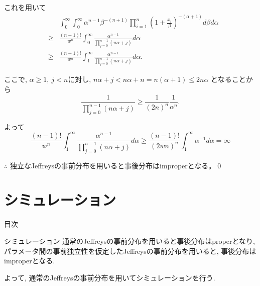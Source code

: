 \documentclass[12pt,dvipdfmx]{beamer}
\begin{document}
\begin{frame}

これを用いて
\begin{eqnarray*}
&&
\int_0^\infty \int_0^\infty \alpha^{n-1}\beta ^{-(n+1)}
\prod_{i=1}^n\left(1+\frac{x_i}{\beta }\right)^{-(\alpha +1)}d\beta d\alpha \\
&\geq&
\frac{(n-1)!}{w^n}\int_0^\infty
\frac{\alpha ^{n-1}}{\prod_{j=0}^{n-1}(n\alpha +j)}d\alpha \\
&\geq&
\frac{(n-1)!}{w^n}\int_1^\infty
\frac{\alpha ^{n-1}}{\prod_{j=0}^{n-1}(n\alpha +j)}d\alpha .
\end{eqnarray*}

\end{frame}


\begin{frame}
ここで, $\alpha \geq 1,~j<n$に対し, $n\alpha +j < n\alpha +n 
= n(\alpha +1)\leq 2n\alpha $
となることから
\begin{equation}
\frac{1}{\prod_{j=0}^{n-1}(n\alpha +j)}
\geq
\frac{1}{(2n)^n}\frac{1}{\alpha ^n} .
\end{equation}

よって
\begin{equation}
\frac{(n-1)!}{w^n}\int_1^\infty 
\frac{\alpha ^{n-1}}{\prod_{j=0}^{n-1}(n\alpha +j)}d\alpha
\geq
\frac{(n-1)!}{(2wn)^n}\int_1^\infty \alpha ^{-1}d\alpha
=\infty \nonumber
\end{equation}

$\therefore$
独立なJeffreysの事前分布を用いると事後分布はimproperとなる。\qed
\end{frame}



\section{シミュレーション}


\begin{frame}
{\large 目次}
\tableofcontents[currentsection]
\end{frame}


\begin{frame}{シミュレーション}
通常のJeffreysの事前分布を用いると事後分布はproperとなり, パラメータ間の事前独立性を仮定したJeffreysの事前分布を用いると, 事後分布はimproperとなる. 

よって, 通常のJeffreysの事前分布を用いてシミュレーションを行う. 


\end{frame}
\end{document}

